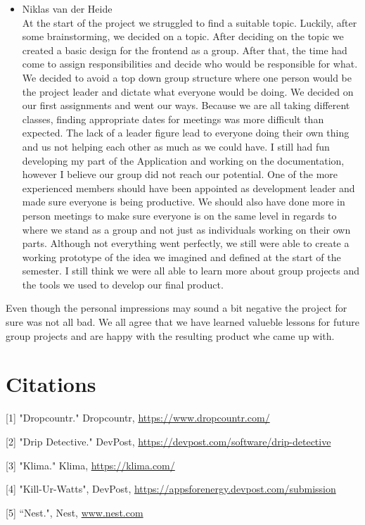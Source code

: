 \documentclass[10pt]{article}
\begin{document}
\begin{multicols*}{2}
\begin{itemize}
  \item {Niklas van der Heide}\\
  At the start of the project we struggled to find a suitable topic. Luckily, after some brainstorming, we decided on a topic. After deciding on the topic we created a basic design for the frontend as a group. After that, the time had come to assign responsibilities and decide who would be responsible for what. We decided to avoid a top down group structure where one person would be the project leader and dictate what everyone would be doing. We decided on our first assignments and went our ways. Because we are all taking different classes, finding appropriate dates for meetings was more difficult than expected. The lack of a leader figure lead to everyone doing their own thing and us not helping each other as much as we could have. I still had fun developing my part of the Application and working on the documentation, however I believe our group did not reach our potential. One of the more experienced members should have been appointed as development leader and made sure everyone is being productive. We should also have done more in person meetings to make sure everyone is on the same level in regards to where we stand as a group and not just as individuals working on their own parts.
  Although not everything went perfectly, we still were able to create a working prototype of the idea we imagined and defined at the start of the semester. I still think we were all able to learn more about group projects and the tools we used to develop our final product.

\end{itemize}

Even though the personal impressions may sound a bit negative the project for sure was not all bad.
We all agree that we have learned valueble lessons for future group projects and are happy with the resulting product whe came up with.

\end{multicols*}

\clearpage
\section{Citations}
[1] "Dropcountr." Dropcountr, \href{https://www.dropcountr.com/}{https://www.dropcountr.com/}

[2] "Drip Detective." DevPost, \href{https://devpost.com/software/drip-detective}{https://devpost.com/software/drip-detective}

[3] "Klima." Klima, \href{https://klima.com/}{https://klima.com/}

[4] "Kill-Ur-Watts", DevPost, \href{https://appsforenergy.devpost.com/submission}{https://appsforenergy.devpost.com/submission}

[5] “Nest.", Nest, \href{http://www.nest.com}{www.nest.com}
\end{document}
